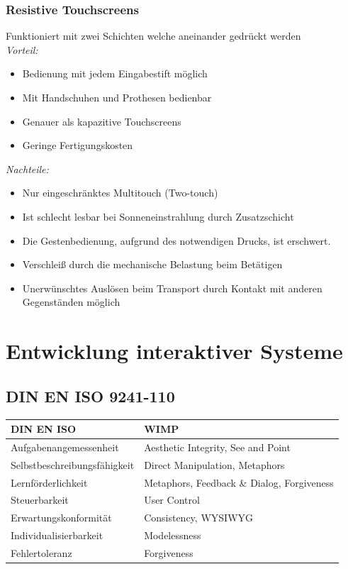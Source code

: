 \documentclass[8pt,a4paper,landscape]{extarticle}
\begin{document}
\begin{multicols*}{4}
	\subsubsection{Resistive Touchscreens}
	Funktioniert mit zwei Schichten welche aneinander gedrückt werden \\
	\textit{Vorteil:}
	\begin{itemize}
		\item Bedienung mit jedem Eingabestift möglich
		\item Mit Handschuhen und Prothesen bedienbar
		\item Genauer als kapazitive Touchscreens
		\item Geringe Fertigungskosten
	\end{itemize}
	\textit{Nachteile:}
	\begin{itemize}
		\item Nur eingeschränktes Multitouch (Two-touch)
		\item Ist schlecht lesbar bei Sonneneinstrahlung durch Zusatzschicht
		\item Die Gestenbedienung, aufgrund des notwendigen Drucks, ist erschwert.
		\item Verschleiß durch die mechanische Belastung beim Betätigen
		\item Unerwünschtes Auslösen beim Transport durch Kontakt mit anderen
		      Gegenständen möglich
	\end{itemize}
	\section{Entwicklung interaktiver Systeme}
	\subsection{DIN EN ISO 9241-110}
	\begin{tabularx}{\linewidth}{|l|X|} \hline
		\textbf{DIN EN ISO}          & \textbf{WIMP}                              \\\hline
		Aufgabenangemessenheit       & Aesthetic Integrity, See and Point         \\\hline
		Selbstbeschreibungsfähigkeit & Direct Manipulation, Metaphors             \\\hline
		Lernförderlichkeit           & Metaphors, Feedback \& Dialog, Forgiveness \\\hline
		Steuerbarkeit                & User Control                               \\\hline
		Erwartungskonformität        & Consistency, WYSIWYG                       \\\hline
		Individualisierbarkeit       & Modelessness                               \\\hline
		Fehlertoleranz               & Forgiveness                                \\\hline
	\end{tabularx}

\end{multicols*}
\end{document}
